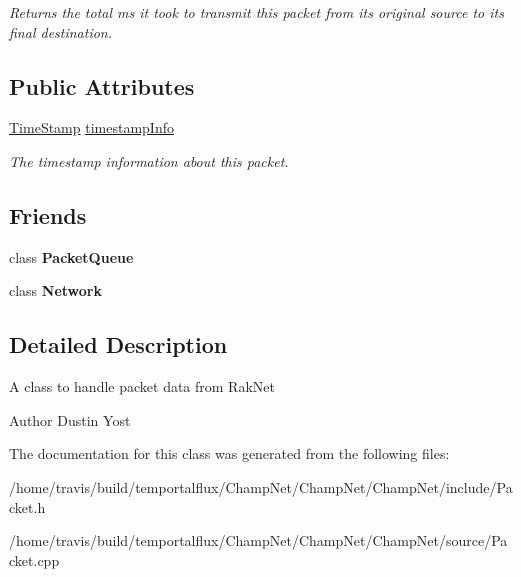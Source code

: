 \begin{DoxyCompactItemize}
\begin{DoxyCompactList}\small\item\em Returns the total ms it took to transmit this packet from its original source to its final destination. \end{DoxyCompactList}\end{DoxyCompactItemize}
\subsection*{Public Attributes}
\begin{DoxyCompactItemize}
\item 
\hypertarget{class_champ_net_1_1_packet_a0fcefd5ba56854e5a8e3e63a51e3963e}{\hyperlink{struct_champ_net_1_1_time_stamp}{Time\-Stamp} \hyperlink{class_champ_net_1_1_packet_a0fcefd5ba56854e5a8e3e63a51e3963e}{timestamp\-Info}}\label{class_champ_net_1_1_packet_a0fcefd5ba56854e5a8e3e63a51e3963e}

\begin{DoxyCompactList}\small\item\em The timestamp information about this packet. \end{DoxyCompactList}\end{DoxyCompactItemize}
\subsection*{Friends}
\begin{DoxyCompactItemize}
\item 
\hypertarget{class_champ_net_1_1_packet_ac3f1afb9cc164b535c73e6f5909519ff}{class {\bfseries Packet\-Queue}}\label{class_champ_net_1_1_packet_ac3f1afb9cc164b535c73e6f5909519ff}

\item 
\hypertarget{class_champ_net_1_1_packet_a88b59289ffd793fecd040d32e397b1e9}{class {\bfseries Network}}\label{class_champ_net_1_1_packet_a88b59289ffd793fecd040d32e397b1e9}

\end{DoxyCompactItemize}


\subsection{Detailed Description}
A class to handle packet data from Rak\-Net \begin{DoxyAuthor}{Author}
Dustin Yost 
\end{DoxyAuthor}


The documentation for this class was generated from the following files\-:\begin{DoxyCompactItemize}
\item 
/home/travis/build/temportalflux/\-Champ\-Net/\-Champ\-Net/\-Champ\-Net/include/Packet.\-h\item 
/home/travis/build/temportalflux/\-Champ\-Net/\-Champ\-Net/\-Champ\-Net/source/Packet.\-cpp\end{DoxyCompactItemize}
